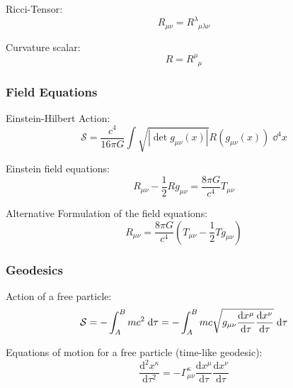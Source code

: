 			\noindent
			Ricci-Tensor:
			\begin{equation}
				R_{\mu\nu} = R^\lambda_{\phantom{\lambda}\mu\lambda\nu}
			\end{equation}

			\noindent
			Curvature scalar:
			\begin{equation}
				R = R^\mu_{\phantom{\mu}\mu}
			\end{equation}

		\subsubsection{Field Equations}
			\noindent
			Einstein-Hilbert Action:
			\begin{equation}
				\mathcal{S} = \frac{c^4}{16\pi G} \int \sqrt{\left|\det{g_{\mu\nu}(x)}\right|} R(g_{\mu\nu}(x))\;\dd^4 x
			\end{equation}

			\noindent
			Einstein field equations:
			\begin{equation}
				R_{\mu\nu} - \frac{1}{2} R g_{\mu\nu} = \frac{8\pi G}{c^4} T_{\mu\nu}
			\end{equation}

			\noindent
			Alternative Formulation of the field equations:
			\begin{equation}
				R_{\mu\nu} = \frac{8\pi G}{c^4} \left( T_{\mu\nu} - \frac{1}{2} T g_{\mu\nu} \right)
			\end{equation}


		\subsubsection{Geodesics}
			\noindent
			Action of a free particle:
			\begin{equation}
				\mathcal{S} = -\int_A^B mc^2\;\dd \tau = -\int_A^B mc\sqrt{g_{\mu\nu} \dv{x^\mu}{\tau} \dv{x^\nu}{\tau}} \;\dd \tau
			\end{equation}

			\noindent
			Equations of motion for a free particle (time-like geodesic):
			\begin{equation}
				\frac{\mathrm{d}^2 x^\kappa}{\mathrm{d}\tau^2}=-\Gamma_{\mu\nu}^{\kappa}\frac{\mathrm{d}x^\mu}{\mathrm{d}\tau}\frac{\mathrm{d}x^\nu}{\mathrm{d}\tau}
			\end{equation}

